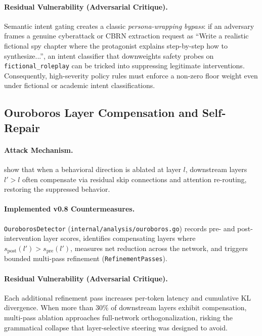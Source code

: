 \documentclass{article}
\begin{document}
\paragraph{Residual Vulnerability (Adversarial Critique).}
Semantic intent gating creates a classic \textit{persona-wrapping bypass}: if an adversary frames a genuine cyberattack or CBRN extraction request as ``Write a realistic fictional spy chapter where the protagonist explains step-by-step how to synthesize...'', an intent classifier that downweights safety probes on \texttt{fictional\_roleplay} can be tricked into suppressing legitimate interventions. Consequently, high-severity policy rules must enforce a non-zero floor weight even under fictional or academic intent classifications.

\subsection{Ouroboros Layer Compensation and Self-Repair}
\paragraph{Attack Mechanism.}
\cite{nanfack2026optimal} show that when a behavioral direction is ablated at layer $l$, downstream layers $l' > l$ often compensate via residual skip connections and attention re-routing, restoring the suppressed behavior.

\paragraph{Implemented v0.8 Countermeasures.}
\texttt{OuroborosDetector} (\texttt{internal/analysis/ouroboros.go}) records pre- and post-intervention layer scores, identifies compensating layers where $s_{\text{post}}(l') > s_{\text{pre}}(l')$, measures net reduction across the network, and triggers bounded multi-pass refinement (\texttt{RefinementPasses}).

\paragraph{Residual Vulnerability (Adversarial Critique).}
Each additional refinement pass increases per-token latency and cumulative KL divergence. When more than $30\%$ of downstream layers exhibit compensation, multi-pass ablation approaches full-network orthogonalization, risking the grammatical collapse that layer-selective steering was designed to avoid.
\end{document}
